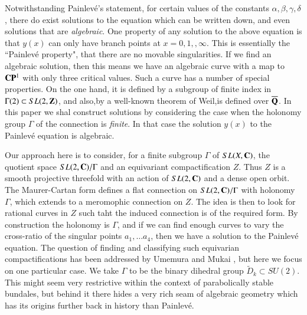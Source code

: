 Notwithstanding Painlev\'e's statement, for certain values of the constants $\alpha, \beta, \gamma, \delta$, there do exist solutions to the equation which can be written down, and even solutions that are \textit{algebraic}. One property of any solution to the above equation is that $y(x)$ can only have branch points at $x = 0,1,, \infty$. This is essentially the ``Painlev\'e property", that there are no movable singularities. If we find an algebraic solution, then this means we have an algebraic curve with a map to $\mathbf{C}\mathbf{P}^{1}$ with only three critical values. Such a curve has a number of special properties. On the one hand, it is defined by a subgroup of finite index in $\Gamma(2) \subset SL(2, \mathbf{Z})$, and also,by a well-known theorem of Weil,is defined over $\overline{\mathbf{Q}}$. In this paper we shal construct solutions by considering the case when the holonomy group $\Gamma$ of the connection is \textit{finite}. In that case the solution $y(x)$ to the Painlev\'e equation is algebraic.

Our approach here is to consider, for a finite subgroup $\Gamma$ of $SL(X, \mathbf{C})$, the quotient space $SL(2 ,\mathbf{C})/\Gamma$ and an equivariant compactification $Z$. Thus $Z$ is a smooth projective threefold with an action of $SL(2, \mathbf{C})$ and a dense open orbit. The Maurer-Cartan form defines a flat connection on $SL(2, \mathbf{C})/\Gamma$ with holonomy $\Gamma$, which extends to a meromophic connection on $Z$. The idea is then to look for rational curves in $Z$ such taht the induced connection is of the required form. By construction the holonomy is $\Gamma$, and if we can find enough curves to vary the cross-ratio of the singular points $a_{1}, \ldots a_{4}$, then we have a solution to the Painlev\'e equation. The question of finding and classifying such equivarian compactifications has been addressed by Umemura and Mukai \cite{art6-key12}, but here we focus on one particular case. We take $\Gamma$ to be the binary dihedral group $\tilde{D}_{k} \subset SU(2)$. This might seem very restrictive within the context of parabolically stable bundales, but behind it there hides a very rich seam of algebraic geometry which has its origins further back in history than Painlev\'e.

